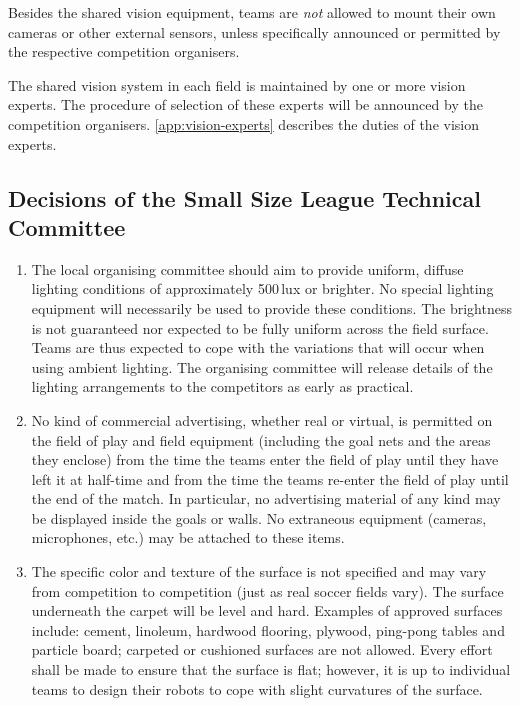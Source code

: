 Besides the shared vision equipment, teams are \emph{not} allowed to mount their own cameras or other external sensors, unless specifically announced or permitted by the respective competition organisers.

The shared vision system in each field is maintained by one or more vision experts.
The procedure of selection of these experts will be announced by the competition organisers.
\autoref{app:vision-experts} describes the duties of the vision experts.

\subsection*{Decisions of the Small Size League Technical Committee}
\begin{enumerate}
\item
The local organising committee should aim to provide uniform, diffuse lighting conditions of approximately 500\,lux or brighter.
No special lighting equipment will necessarily be used to provide these conditions.
The brightness is not guaranteed nor expected to be fully uniform across the field surface.
Teams are thus expected to cope with the variations that will occur when using ambient lighting.
The organising committee will release details of the lighting arrangements to the competitors as early as practical.

\item
No kind of commercial advertising, whether real or virtual, is permitted on the field of play and field equipment (including the goal nets and the areas they enclose) from the time the teams enter the field of play until they have left it at half-time and from the time the teams re-enter the field of play until the end of the match.
In particular, no advertising material of any kind may be displayed inside the goals or walls.
No extraneous equipment (cameras, microphones, etc.) may be attached to these items.

\item
The specific color and texture of the surface is not specified and may vary from competition to competition (just as real soccer fields vary).
The surface underneath the carpet will be level and hard.
Examples of approved surfaces include: cement, linoleum, hardwood flooring, plywood, ping-pong tables and particle board; carpeted or cushioned surfaces are not allowed.
Every effort shall be made to ensure that the surface is flat; however, it is up to individual teams to design their robots to cope with slight curvatures of the surface.
\end{enumerate}
